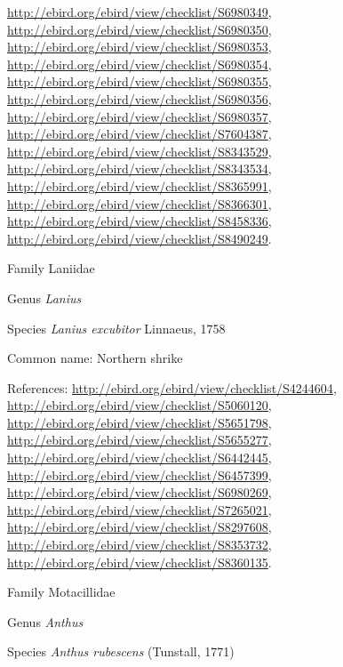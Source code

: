 \documentclass[9pt, article]{memoir}
\begin{document}
\begin{multicols}{2}
\url{http://ebird.org/ebird/view/checklist/S6980349}, 
\url{http://ebird.org/ebird/view/checklist/S6980350}, 
\url{http://ebird.org/ebird/view/checklist/S6980353}, 
\url{http://ebird.org/ebird/view/checklist/S6980354}, 
\url{http://ebird.org/ebird/view/checklist/S6980355}, 
\url{http://ebird.org/ebird/view/checklist/S6980356}, 
\url{http://ebird.org/ebird/view/checklist/S6980357}, 
\url{http://ebird.org/ebird/view/checklist/S7604387}, 
\url{http://ebird.org/ebird/view/checklist/S8343529}, 
\url{http://ebird.org/ebird/view/checklist/S8343534}, 
\url{http://ebird.org/ebird/view/checklist/S8365991}, 
\url{http://ebird.org/ebird/view/checklist/S8366301}, 
\url{http://ebird.org/ebird/view/checklist/S8458336}, 
\url{http://ebird.org/ebird/view/checklist/S8490249}.

\vspace{6pt}\noindent\hspace{24pt}Family Laniidae


\vspace{6pt}\noindent\hspace{30pt}Genus \textit{Lanius}


\vspace{6pt}\noindent\hspace{36pt}Species \textit{Lanius excubitor} Linnaeus, 1758


Common name: Northern shrike

References: 
\url{http://ebird.org/ebird/view/checklist/S4244604}, 
\url{http://ebird.org/ebird/view/checklist/S5060120}, 
\url{http://ebird.org/ebird/view/checklist/S5651798}, 
\url{http://ebird.org/ebird/view/checklist/S5655277}, 
\url{http://ebird.org/ebird/view/checklist/S6442445}, 
\url{http://ebird.org/ebird/view/checklist/S6457399}, 
\url{http://ebird.org/ebird/view/checklist/S6980269}, 
\url{http://ebird.org/ebird/view/checklist/S7265021}, 
\url{http://ebird.org/ebird/view/checklist/S8297608}, 
\url{http://ebird.org/ebird/view/checklist/S8353732}, 
\url{http://ebird.org/ebird/view/checklist/S8360135}.

\vspace{6pt}\noindent\hspace{24pt}Family Motacillidae


\vspace{6pt}\noindent\hspace{30pt}Genus \textit{Anthus}


\vspace{6pt}\noindent\hspace{36pt}Species \textit{Anthus rubescens} (Tunstall, 1771)



\end{multicols}
\end{document}
